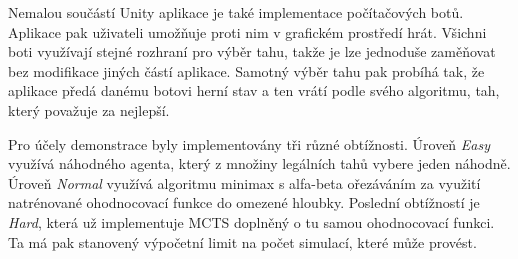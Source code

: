 Nemalou součástí Unity aplikace je také implementace počítačových botů. Aplikace pak uživateli umožňuje proti nim v grafickém prostředí hrát. Všichni boti 
využívají stejné rozhraní pro výběr tahu, takže je lze jednoduše zaměňovat bez modifikace jiných částí aplikace. Samotný výběr tahu pak probíhá tak, že 
aplikace předá danému botovi herní stav a ten vrátí podle svého algoritmu, tah, který považuje za nejlepší.

Pro účely demonstrace byly implementovány tři různé obtížnosti. Úroveň \emph{Easy} využívá náhodného agenta, který z množiny legálních tahů vybere jeden náhodně.
Úroveň \emph{Normal} využívá algoritmu minimax s alfa-beta ořezáváním za využití natrénované ohodnocovací funkce do omezené hloubky. Poslední obtížností je
\emph{Hard}, která už implementuje MCTS doplněný o tu samou ohodnocovací funkci. Ta má pak stanovený výpočetní limit na počet simulací, které může provést.
